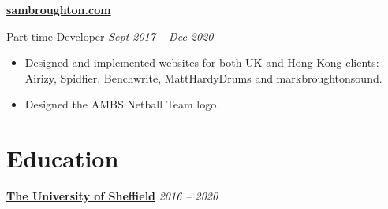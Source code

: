 \documentclass[10pt]{article} %
\begin{document}
\begin{changemargin}{0pt}{0.5pt}
\begin{minipage}[t]{0.5\textwidth}
\begin{changemargin}{5pt}{5pt}

\vspace{5pt}
\underline{\textbf{sambroughton.com}}\\
\par
\vspace{-10pt}
Part-time Developer \textit{\hfill Sept 2017 -- Dec 2020}\\
\vspace{-10pt}

\begin{itemize} \itemsep-2pt %
  \item Designed and implemented websites for both UK and Hong Kong clients: Airizy, Spidfier, Benchwrite, MattHardyDrums and markbroughtonsound. 
  \item Designed the AMBS Netball Team logo.
  
\end{itemize}


\end{changemargin}
\end{minipage} %
\hfill
\begin{minipage}[t]{0.44\textwidth} %
\vspace{0pt} %


\section{Education}

\begin{changemargin}{5pt}{5pt}


\vspace{5pt}
\underline{\textbf{The University of Sheffield}} \hfill \textit{ 2016 --  2020}\\
\par
\vspace{-15pt}


\end{changemargin}
\end{minipage}
\end{changemargin}
\end{document}

